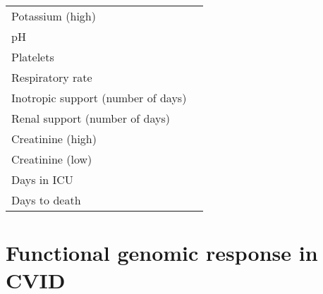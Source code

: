 \begin{table}[H]
\begin{tabular}{ll}
		Potassium (high) & \\
		pH    &  \\
    Platelets &  \\
    Respiratory rate &  \\
    Inotropic support (number of days) &  \\
    Renal support (number of days) &  \\
    Creatinine (high) &  \\
    Creatinine (low) &  \\
		Days in ICU & \\
		Days to death & \\
    \bottomrule
    \end{tabular}%
  \label{tab:app.cov.sepsis}%
\end{table}%



\chapter{Functional genomic response in CVID}
\label{app:CVID}


